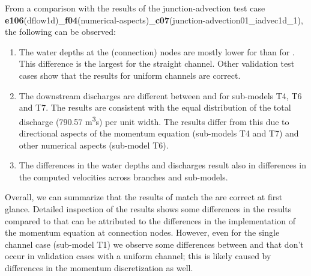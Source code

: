 From a comparison with the results of the \dflowoned junction-advection test case \textbf{e106}(dflow1d)\_\textbf{f04}(numerical-aspects)\_\textbf{c07}(junction-advection01\_iadvec1d\_1), the following can be observed:
\begin{enumerate}
\item The water depths at the (connection) nodes are mostly lower for \dflowfm than for \dflowoned.
This difference is the largest for the straight channel.
Other \dflowfm validation test cases show that the results for uniform channels are correct.
\item The downstream discharges are different between \dflowfm and \dflowoned for sub-models T4, T6 and T7.
The \dflowoned results are consistent with the equal distribution of the total discharge (790.57 m\textsuperscript{3}\/s) per unit width.
The \dflowfm results differ from this due to directional aspects of the momentum equation (sub-models T4 and T7) and other numerical aspects (sub-model T6).
\item The differences in the water depths and discharges result also in differences in the computed velocities across branches and sub-models.
\end{enumerate}

Overall, we can summarize that the results of \dflowfm match the are correct at first glance.
Detailed inspection of the results shows some differences in the results compared to \dflowoned that can be attributed to the differences in the implementation of the momentum equation at connection nodes.
However, even for the single channel case (sub-model T1) we observe some differences between \dflowfm and \dflowoned that don't occur in validation cases with a uniform channel; this is likely caused by differences in the momentum discretization as well.
\printrefsegment

